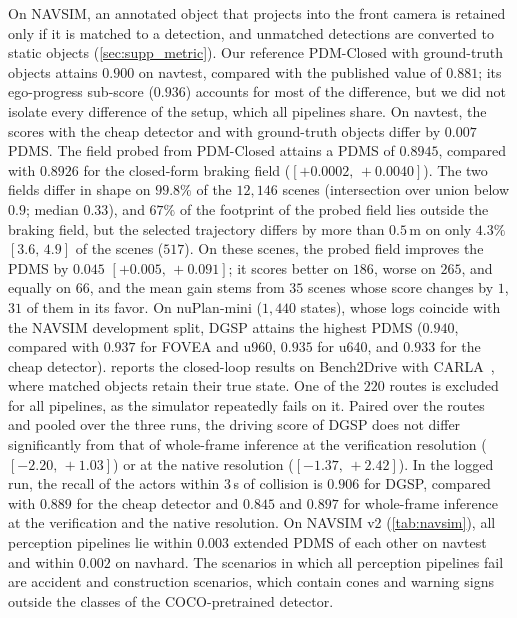 \documentclass[10pt,letterpaper]{article}
\newcommand{\method}{DGSP\xspace}
\newcommand{\ci}[2]{[#1,\allowbreak\,#2]}
\theoremstyle{remark}
\theoremstyle{plain}
\theoremstyle{definition}
\begin{document}
On NAVSIM, an annotated object that projects into the front camera is retained only if it is matched to a detection, and unmatched detections are converted to static objects (\cref{sec:supp_metric}).
Our reference PDM-Closed with ground-truth objects attains $0.900$ on navtest, compared with the published value of $0.881$; its ego-progress sub-score ($0.936$) accounts for most of the difference, but we did not isolate every difference of the setup, which all pipelines share.
On navtest, the scores with the cheap detector and with ground-truth objects differ by $0.007$ PDMS.
The field probed from PDM-Closed attains a PDMS of $0.8945$, compared with $0.8926$ for the closed-form braking field ($\ci{+0.0002}{+0.0040}$).
The two fields differ in shape on $99.8\%$ of the $12{,}146$ scenes (intersection over union below $0.9$; median $0.33$), and $67\%$ of the footprint of the probed field lies outside the braking field, but the selected trajectory differs by more than $0.5$\,m on only $4.3\%$ $\ci{3.6}{4.9}$ of the scenes ($517$).
On these scenes, the probed field improves the PDMS by $0.045$ $\ci{+0.005}{+0.091}$; it scores better on $186$, worse on $265$, and equally on $66$, and the mean gain stems from $35$ scenes whose score changes by $1$, $31$ of them in its favor.
On nuPlan-mini ($1{,}440$ states), whose logs coincide with the NAVSIM development split, \method attains the highest PDMS ($0.940$, compared with $0.937$ for FOVEA and u960, $0.935$ for u640, and $0.933$ for the cheap detector).
 reports the closed-loop results on Bench2Drive with CARLA~\cite{carla}, where matched objects retain their true state. One of the $220$ routes is excluded for all pipelines, as the simulator repeatedly fails on it.
Paired over the routes and pooled over the three runs, the driving score of \method does not differ significantly from that of whole-frame inference at the verification resolution ($\ci{-2.20}{+1.03}$) or at the native resolution ($\ci{-1.37}{+2.42}$).
In the logged run, the recall of the actors within $3$\,s of collision is $0.906$ for \method, compared with $0.889$ for the cheap detector and $0.845$ and $0.897$ for whole-frame inference at the verification and the native resolution.
On NAVSIM v2 (\cref{tab:navsim}), all perception pipelines lie within $0.003$ extended PDMS of each other on navtest and within $0.002$ on navhard.
The scenarios in which all perception pipelines fail are accident and construction scenarios, which contain cones and warning signs outside the classes of the COCO-pretrained detector.
\end{document}
